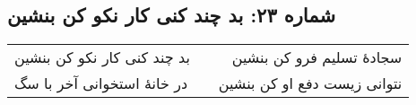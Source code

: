 \begin{center}
\section*{شماره ۲۳: بد چند کنی کار نکو کن بنشین}
\label{sec:023}
\begin{longtable}{l p{0.5cm} r}
بد چند کنی کار نکو کن بنشین
&&
سجادهٔ تسلیم فرو کن بنشین
\\
در خانهٔ استخوانی آخر با سگ
&&
نتوانی زیست دفع او کن بنشین
\\
\end{longtable}
\end{center}
